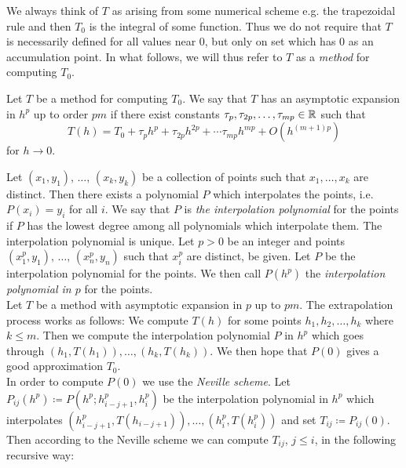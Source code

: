 We always think of \(T\) as arising from some numerical scheme e.g. the trapezoidal rule and then \(T_0\) is the integral of some function. Thus we do not require that \(T\) is necessarily defined for all values near \(0\), but only on set which has \(0\) as an accumulation point. In what follows, we will thus refer to \(T\) as a {\it method} for computing \(T_0\).

\begin{definition}
Let \(T\) be a method for computing \(T_0\). We say that \(T\) has an asymptotic expansion in \(h^p\) up to order \(pm\) if there exist constants \(\tau_p,\tau_{2p},\ldots,\tau_{mp} \in \mathbb{R}\) such that 
\begin{equation}\label{expansion}
T(h) = T_0 + \tau_ph^p + \tau_{2p}h^{2p} + \cdots \tau_{mp}h^{mp} + O(h^{(m+1)p})
\end{equation}
for \(h\rightarrow 0\).
\end{definition}

Let \((x_1,y_1),\,\ldots,\,(x_k,y_k)\) be a collection of points such that \(x_1,\ldots,x_k\) are distinct. Then there exists a polynomial \(P\) which interpolates the points, i.e. \(P(x_i) = y_i\) for all \(i\). We say that \(P\) is {\it the interpolation polynomial} for the points if \(P\) has the lowest degree among all polynomials which interpolate them. The interpolation polynomial is unique. Let \(p > 0\) be an integer and points \((x_1^p,y_1),\,\ldots,\,(x_n^p,y_n)\) such that \(x_i^p\) are distinct, be given. Let \(P\) be the interpolation polynomial for the points. We then call \(P(h^p)\) the {\it interpolation polynomial in \(p\)} for the points.\\

Let \(T\) be a method with asymptotic expansion in \(p\) up to \(pm\). The extrapolation process works as follows: We compute \(T(h)\) for some points \(h_1,h_2,\ldots,h_k\) where \(k \leq m\). Then we compute the interpolation polynomial \(P\) in \(h^p\) which goes through \((h_1,T(h_1)),\ldots,(h_k,T(h_k))\). We then hope that \(P(0)\) gives a good approximation \(T_0\).\\

In order to compute \(P(0)\) we use the {\it Neville scheme}. Let \(P_{ij}(h^p) \coloneqq P(h^p; h_{i-j+1}^p, h_i^p)\) be the interpolation polynomial in \(h^p\) which interpolates \((h_{i-j+1}^p, T(h_{i-j+1})),\ldots, (h_i^p, T(h_i^p))\) and set \(T_{ij}\coloneqq P_{ij}(0)\). Then according to the Neville scheme we can compute \(T_{ij}\), \(j\leq i\), in the following recursive way:

